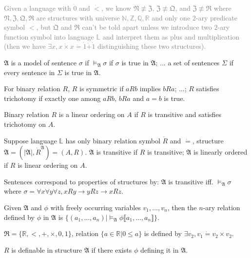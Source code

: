\documentclass{article}
\begin{document}
	\textcolor{gray}{\eg Given a language with $\dot 0$ and $\dot <$, we know $\mathfrak{N} \not\equiv \mathfrak{Z}$, $\mathfrak{Z} \not\equiv \mathfrak{Q}$, and $\mathfrak{Z} \not\equiv \mathfrak{R}$ where $\mathfrak{N}, \mathfrak{Z}, \mathfrak{Q}, \mathfrak{R}$ are structures with universe $\mathbb{N}, \mathbb{Z}, \mathbb{Q}, \mathbb{R}$ and only one $2$-ary predicate symbol $<$, but $\mathfrak{Q}$ and $\mathfrak{R}$ can't be told apart unless we introduce two $2$-ary function symbol into language $\mathbb{L}$ and interpret them as plus and multiplication (then we have $\exists x, x \dot\times x \dot= \dot1 \dot+ \dot1$ distinguishing these two structures).}

	$\mathfrak{A}$ is a model of sentence $\sigma$ if $\vDash_{\mathfrak{A}} \sigma$ if $\sigma$ is true in $\mathfrak{A}$; ... a set of sentences $\Sigma$ if every sentence in $\Sigma$ is true in $\mathfrak{A}$.
	
	For binary relation $R$, $R$ is symmetric if $aRb$ implies $bRa$; ...; $R$ satisfies trichotomy if exactly one among $aRb$, $bRa$ and $a=b$ is true.
	
	Binary relation $R$ is a linear ordering on $A$ if $R$ is transitive and satisfies trichotomy on $A$.

	Suppose language $\mathbb{L}$ has only binary relation symbol $\dot R$ and $\dot =$, structure $\mathfrak{A}=(|\mathfrak{A}|, \dot R^{\mathfrak{A}})=(A,R)$. $\mathfrak{A}$ is transitive if $R$ is transitive; $\mathfrak{A}$ is linearly ordered if $R$ is linear ordering on $A$.
	
	Sentences correspond to properties of structures by: \eg $\mathfrak{A}$ is transitive iff. $\vDash_{\mathfrak{A}} \sigma$ where $\sigma=\forall x \forall y \forall z, xRy \to yRz \to xRz$.
	
	Given $\mathfrak{A}$ and $\phi$ with freely occurring variables $v_1,...,v_n$, then the $n$-ary relation defined by $\phi$ in $\mathfrak{A}$ is $\{ (a_1,...,a_n) | \vDash_{\mathfrak{A}} \phi \llbracket a_1,...,a_n \rrbracket \}$.
	
	\eg $\mathfrak{R}=\{ \mathbb{R}, <, +, \times, 0, 1\}$, relation $\{a\in\mathbb{R}|0 \le a\}$ is defined by $\exists v_2, v_1 \dot= v_2 \times v_2$.

	$R$ is definable in structure $\mathfrak{A}$ if there exists $\phi$ defining it in $\mathfrak{A}$.
	
\end{document}
